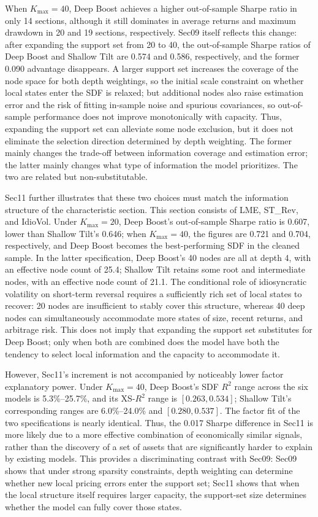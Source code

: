 \documentclass[12pt]{article}
\begin{document}
When \(K_{\max}=40\), Deep Boost achieves a higher out-of-sample Sharpe ratio in only 14 sections, although it still dominates in average returns and maximum drawdown in 20 and 19 sections, respectively. Sec09 itself reflects this change: after expanding the support set from 20 to 40, the out-of-sample Sharpe ratios of Deep Boost and Shallow Tilt are 0.574 and 0.586, respectively, and the former 0.090 advantage disappears. A larger support set increases the coverage of the node space for both depth weightings, so the initial scale constraint on whether local states enter the SDF is relaxed; but additional nodes also raise estimation error and the risk of fitting in-sample noise and spurious covariances, so out-of-sample performance does not improve monotonically with capacity. Thus, expanding the support set can alleviate some node exclusion, but it does not eliminate the selection direction determined by depth weighting. The former mainly changes the trade-off between information coverage and estimation error; the latter mainly changes what type of information the model prioritizes. The two are related but non-substitutable.

Sec11 further illustrates that these two choices must match the information structure of the characteristic section. This section consists of LME, ST\_Rev, and IdioVol. Under \(K_{\max}=20\), Deep Boost's out-of-sample Sharpe ratio is 0.607, lower than Shallow Tilt's 0.646; when \(K_{\max}=40\), the figures are 0.721 and 0.704, respectively, and Deep Boost becomes the best-performing SDF in the cleaned sample. In the latter specification, Deep Boost's 40 nodes are all at depth 4, with an effective node count of 25.4; Shallow Tilt retains some root and intermediate nodes, with an effective node count of 21.1. The conditional role of idiosyncratic volatility on short-term reversal requires a sufficiently rich set of local states to recover: 20 nodes are insufficient to stably cover this structure, whereas 40 deep nodes can simultaneously accommodate more states of size, recent returns, and arbitrage risk. This does not imply that expanding the support set substitutes for Deep Boost; only when both are combined does the model have both the tendency to select local information and the capacity to accommodate it.

However, Sec11's increment is not accompanied by noticeably lower factor explanatory power. Under \(K_{\max}=40\), Deep Boost's SDF \(R^2\) range across the six models is 5.3\%--25.7\%, and its XS-\(R^2\) range is \([0.263,0.534]\); Shallow Tilt's corresponding ranges are 6.0\%--24.0\% and \([0.280,0.537]\). The factor fit of the two specifications is nearly identical. Thus, the 0.017 Sharpe difference in Sec11 is more likely due to a more effective combination of economically similar signals, rather than the discovery of a set of assets that are significantly harder to explain by existing models. This provides a discriminating contrast with Sec09: Sec09 shows that under strong sparsity constraints, depth weighting can determine whether new local pricing errors enter the support set; Sec11 shows that when the local structure itself requires larger capacity, the support-set size determines whether the model can fully cover those states.
\end{document}
